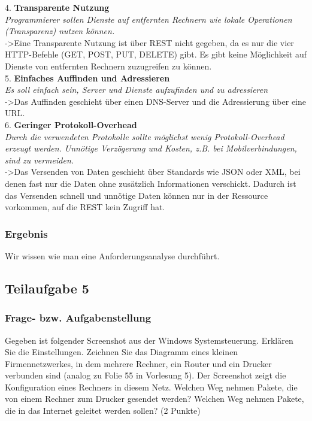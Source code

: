 4. \textbf{Transparente Nutzung} \\
	\textit{Programmierer sollen Dienste auf entfernten Rechnern wie lokale Operationen (Transparenz) nutzen können.} \\
	->Eine Transparente Nutzung ist über REST nicht gegeben, da es nur die vier HTTP-Befehle (GET, POST, PUT, DELETE) gibt. Es gibt keine Möglichkeit auf Dienste von entfernten Rechnern zuzugreifen zu können. \\
	
5. \textbf{Einfaches Auffinden und Adressieren} \\
	\textit{Es soll einfach sein, Server und Dienste aufzufinden und zu adressieren} \\
	->Das Auffinden geschieht über einen DNS-Server und die Adressierung über eine URL. \\
	
6. \textbf{Geringer Protokoll-Overhead} \\
	\textit{Durch die verwendeten Protokolle sollte möglichst wenig Protokoll-Overhead erzeugt werden. Unnötige Verzögerung und Kosten, z.B. bei Mobilverbindungen, sind zu vermeiden.} \\
	->Das Versenden von Daten geschieht über Standards wie JSON oder XML, bei denen fast nur die Daten ohne zusätzlich Informationen verschickt. Dadurch ist das Versenden schnell und unnötige Daten können nur in der Ressource vorkommen, auf die REST kein Zugriff hat. \\
	
\subsubsection{Ergebnis}
Wir wissen wie man eine Anforderungsanalyse durchführt.
	
\subsection{Teilaufgabe 5}

\subsubsection{Frage- bzw. Aufgabenstellung}
 Gegeben ist folgender Screenshot aus der Windows Systemsteuerung. Erklären Sie die Einstellungen. Zeichnen Sie das Diagramm eines kleinen Firmennetzwerkes, in dem mehrere Rechner, ein Router und ein Drucker verbunden sind (analog zu Folie 55 in Vorlesung 5). Der Screenshot zeigt die Konﬁguration eines Rechners in diesem Netz. Welchen Weg nehmen Pakete, die von einem Rechner zum Drucker gesendet werden? Welchen Weg nehmen Pakete, die in das Internet geleitet werden sollen? (2 Punkte)
 
